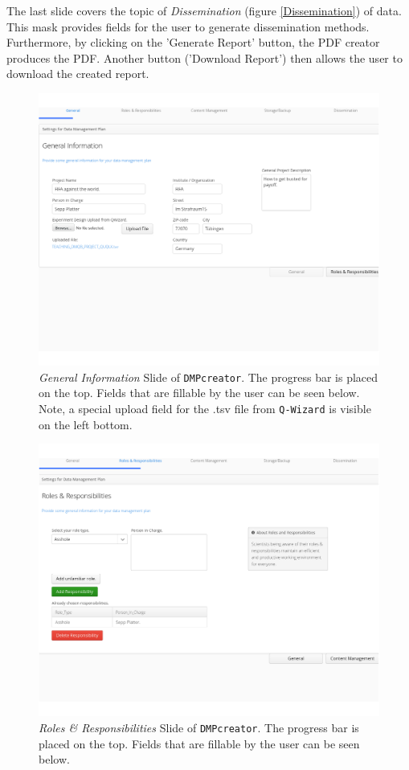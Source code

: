 The last slide covers the topic of \textit{Dissemination} (figure \ref{Dissemination}) of data. This mask provides fields for the user to generate dissemination methods. Furthermore, by clicking on the 'Generate Report' button, the PDF creator produces the PDF. Another button ('Download Report') then allows the user to download the created report.
\begin{landscape}
	\begin{figure}[]
		\centering
		\includegraphics[width=1.2\textwidth]{pictures/GeneralInformation.png}
		\caption{\textit{General Information} Slide of \texttt{DMPcreator}. The progress bar is placed on the top. Fields that are fillable by the user can be seen below. Note, a special upload field for the .tsv file from \texttt{Q-Wizard} is visible on the left bottom.}
		\label{GeneralInformationSlide}
	\end{figure}

\begin{figure}[]
	\centering
	\includegraphics[width=1.2\textwidth]{pictures/RolesResponsibilities.png}
	\caption{\textit{Roles \& Responsibilities} Slide of \texttt{DMPcreator}. The progress bar is placed on the top. Fields that are fillable by the user can be seen below.}
	\label{RolesResponsibilitiesSlide}
\end{figure}


\end{landscape}
